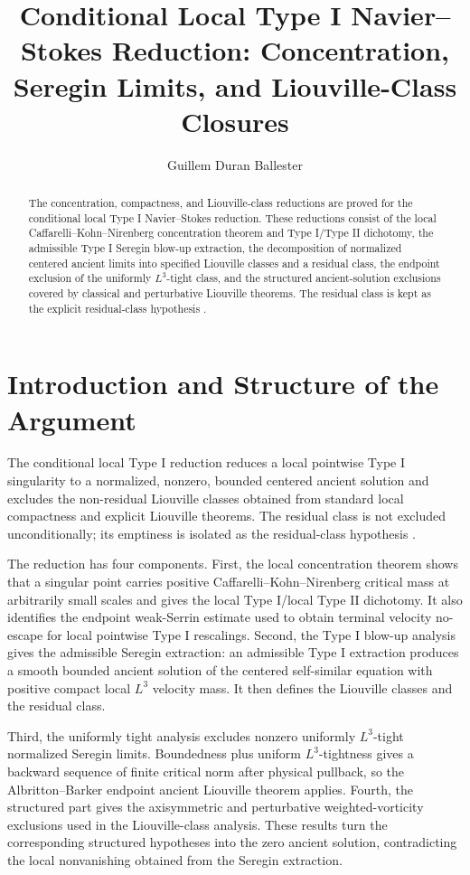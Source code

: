 \documentclass[11pt]{amsart}
\title[Conditional Local Type I Navier--Stokes Reduction]
{Conditional Local Type I Navier--Stokes Reduction: Concentration, Seregin Limits, and Liouville-Class Closures}
\author{Guillem Duran Ballester}
\date{}
\theoremstyle{plain}
\theoremstyle{definition}
\theoremstyle{remark}
\numberwithin{equation}{section}
\begin{document}
\begin{abstract}
The concentration, compactness, and Liouville-class reductions are proved for the
conditional local Type I Navier--Stokes reduction.  These reductions consist of the local
Caffarelli--Kohn--Nirenberg concentration theorem and Type I/Type II dichotomy,
the admissible Type I Seregin blow-up extraction, the decomposition of
normalized centered ancient limits into specified Liouville classes and a
residual class, the endpoint exclusion of the uniformly \(L^3\)-tight class,
and the structured ancient-solution exclusions covered by classical and
perturbative Liouville theorems.  The residual class is kept as the explicit
residual-class hypothesis .
\end{abstract}

\maketitle
\tableofcontents

\section*{Introduction and Structure of the Argument}

The conditional local Type I reduction reduces a local
pointwise Type I singularity to a normalized, nonzero,
bounded centered ancient solution and excludes the non-residual Liouville
classes obtained from standard local compactness and explicit Liouville
theorems.  The residual class is not excluded unconditionally; its emptiness is
isolated as the residual-class hypothesis
.

The reduction has four components.  First, the local concentration theorem
shows that a singular point carries positive Caffarelli--Kohn--Nirenberg
critical mass at arbitrarily small scales and gives the local Type I/local Type
II dichotomy.  It also identifies the endpoint weak-Serrin estimate used to
obtain terminal velocity no-escape for local pointwise Type I rescalings.
Second, the Type I blow-up analysis gives the admissible Seregin extraction:
an admissible Type I extraction produces a smooth bounded ancient solution of
the centered self-similar equation with positive compact local \(L^3\) velocity
mass.  It then defines the Liouville classes and the residual class.

Third, the uniformly tight analysis excludes nonzero uniformly \(L^3\)-tight
normalized Seregin limits.  Boundedness plus uniform
\(L^3\)-tightness gives a backward sequence of finite critical norm after
physical pullback, so the Albritton--Barker endpoint ancient Liouville theorem
applies.  Fourth, the structured part gives the axisymmetric and
perturbative weighted-vorticity exclusions used in the Liouville-class analysis.
These results turn the corresponding structured hypotheses into the zero
ancient solution, contradicting the local nonvanishing obtained from the
Seregin extraction.
\end{document}
